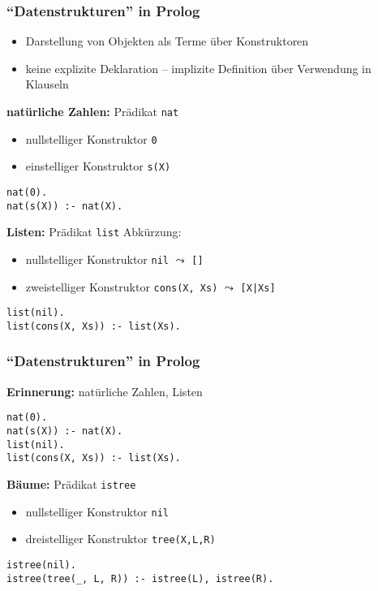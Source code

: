 \documentclass{beamer}
\begin{document}
\begin{frame}[fragile] \frametitle{\enquote{Datenstrukturen} in Prolog}
	\footnotesize
	\begin{itemize}
		\item Darstellung von Objekten als Terme über Konstruktoren
		\item keine explizite Deklaration -- implizite Definition über Verwendung in Klauseln
	\end{itemize}
	
	\textbf{natürliche Zahlen:} Prädikat \texttt{nat}
	\vspace{-.75em}
	\begin{itemize} 
		\item nullstelliger Konstruktor \texttt{0} 
		\item einstelliger Konstruktor \texttt{s(X)}
	\end{itemize}
	
	\begin{lstlisting}
nat(0).
nat(s(X)) :- nat(X).
	\end{lstlisting}
	
	\textbf{Listen:} Prädikat \texttt{list}
	\hfill Abkürzung:
	\vspace{-.75em}
	\begin{itemize} 
		\item nullstelliger Konstruktor \texttt{nil} 
		\hfill $\leadsto$ \texttt{[]} 
		\item zweistelliger Konstruktor \texttt{cons(X, Xs)}
		\hfill $\leadsto$ \texttt{[X|Xs]}
	\end{itemize}
	
	\begin{lstlisting}[firstnumber=3]
list(nil).
list(cons(X, Xs)) :- list(Xs).
	\end{lstlisting}
\end{frame}

\begin{frame}[fragile] \frametitle{\enquote{Datenstrukturen} in Prolog}
	\footnotesize
	
	\textbf{Erinnerung:} natürliche Zahlen, Listen
	
	\begin{lstlisting}
nat(0).
nat(s(X)) :- nat(X).
list(nil).
list(cons(X, Xs)) :- list(Xs).
	\end{lstlisting}
	
	\textbf{Bäume:} Prädikat \texttt{istree}
	\vspace{-0.5em}
	\begin{itemize} \footnotesize
		\item nullstelliger Konstruktor \texttt{nil}
		\item dreistelliger Konstruktor \texttt{tree(X,L,R)} 
	\end{itemize}
	
	\begin{lstlisting}[firstnumber=5]
istree(nil).
istree(tree(_, L, R)) :- istree(L), istree(R).
	\end{lstlisting}
\end{frame}
\end{document}
